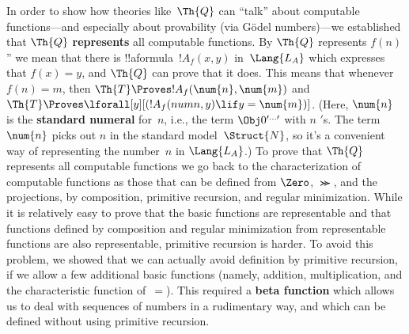 In order to show how theories like~$\Th{Q}$ can ``talk'' about
computable functions---and especially about provability (via G\"odel
numbers)---we established that $\Th{Q}$ \textbf{represents} all
computable functions. By $\Th{Q}$ represents $f(n)$'' we mean that
there is !!a{formula}~$!A_f(x, y)$ in~$\Lang{L_A}$ which expresses
that $f(x) = y$, and $\Th{Q}$ can prove that it does.  This means that
whenever $f(n) = m$, then $\Th{T} \Proves !A_f(\num{n}, \num{m})$ and
$\Th{T} \Proves \lforall[y][(!A_f(num{n}, y) \lif y = \num{m})]$.
(Here, $\num{n}$ is the \textbf{standard numeral} for~$n$, i.e., the
term $\Obj 0^{\prime\dots\prime}$ with $n$ $\prime$s. The
term~$\num{n}$ picks out $n$ in the standard model~$\Struct{N}$, so
it's a convenient way of representing the number~$n$ in $\Lang{L_A}$.)
To prove that $\Th{Q}$ represents all computable functions we go back
to the characterization of computable functions as those that can be
defined from $\Zero$, $\Succ$, and the projections, by composition,
primitive recursion, and regular minimization. While it is relatively
easy to prove that the basic functions are representable and that
functions defined by composition and regular minimization from
representable functions are also representable, primitive recursion is
harder. To avoid this problem, we showed that we can actually avoid
definition by primitive recursion, if we allow a few additional basic
functions (namely, addition, multiplication, and the characteristic
function of~$=$). This required a \textbf{beta function} which allows
us to deal with sequences of numbers in a rudimentary way, and which
can be defined without using primitive recursion.
